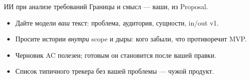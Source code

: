 \begin{frame}{ИИ при анализе требований}
   Границы и смысл --- ваши, из Proposal.

  \medskip
  \begin{itemize}\setlength\itemsep{0.4em}
    \item Дайте модели \emph{ваш} текст: проблема, аудитория, сущности, in/out v1.
    \item Просите истории \emph{внутри} scope и дыры: кого забыли, что противоречит MVP.
    \item Черновик AC полезен; готовым он становится после вашей правки.
    \item Список \flqq типичного трекера\frqq{} без вашей проблемы --- чужой продукт.
  \end{itemize}
\end{frame}
